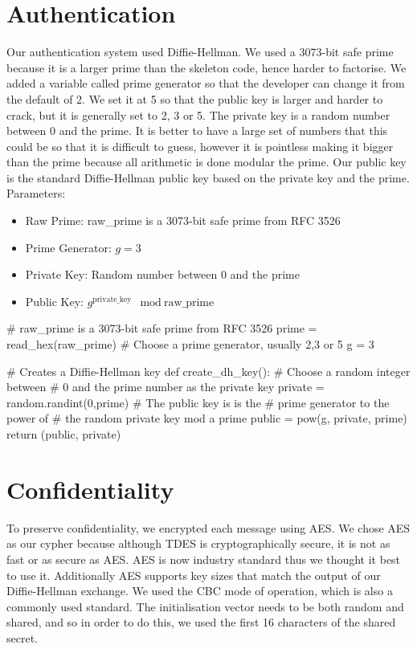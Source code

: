 \documentclass[12pt,a4paper]{article}
\begin{document}
\maketitle

\section{Authentication}
Our authentication system used Diffie-Hellman. We used a 3073-bit safe prime because it is a larger prime than the skeleton code, hence harder to factorise. We added a variable called prime generator so that the developer can change it from the default of 2. We set it at 5 so that the public key is larger and harder to crack, but it is generally set to 2, 3 or 5. The private key is a random number between 0 and the prime. It is better to have a large set of numbers that this could be so that it is difficult to guess, however it is pointless making it bigger than the prime because all arithmetic is done modular the prime. Our public key is the standard Diffie-Hellman public key based on the private key and the prime.\\

Parameters:
\begin{itemize}
\item Raw Prime: raw\_prime is a 3073-bit safe prime from RFC 3526
\item Prime Generator: $g = 3$
\item Private Key: Random number between 0 and the prime
\item Public Key: $g^{\text{private\_key}} \mod \text{raw\_prime}$
\end{itemize}

\begin{center}
\begin{python}
# raw_prime is a 3073-bit safe prime from RFC 3526
prime = read_hex(raw_prime)
# Choose a prime generator, usually 2,3 or 5
g = 3

# Creates a Diffie-Hellman key
def create_dh_key():
    # Choose a random integer between 
    # 0 and the prime number as the private key
    private = random.randint(0,prime)
    # The public key is is the
    # prime generator to the power of 
    # the random private key mod a prime
    public  = pow(g, private, prime)
    return (public, private)
\end{python}
\end{center}

\section{Confidentiality}
To preserve confidentiality, we encrypted each message using AES. We chose AES as our cypher because although TDES is cryptographically secure, it is not as fast or as secure as AES. AES is now industry standard thus we thought it best to use it. Additionally AES supports key sizes that match the output of our Diffie-Hellman exchange. We used the CBC mode of operation, which is also a commonly used standard. The initialisation vector needs to be both random and shared, and so in order to do this, we used the first 16 characters of the shared secret.
\end{document}
